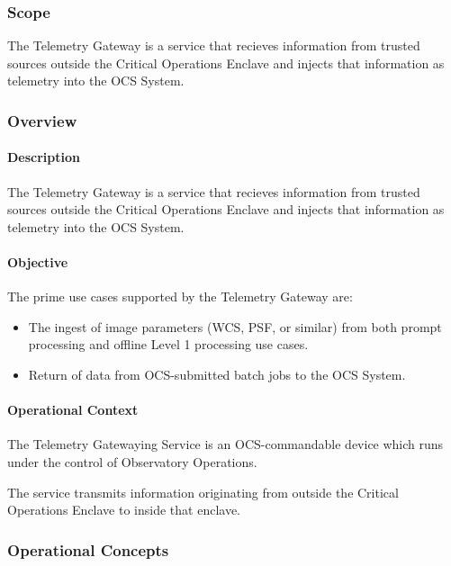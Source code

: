 \subsubsection{Scope}

The Telemetry Gateway is a service that recieves information from
trusted sources outside the Critical Operations Enclave and injects
that information as telemetry into the OCS System.

\subsubsection{Overview}

\paragraph{Description}

The Telemetry Gateway is a service that recieves information from
trusted sources outside the Critical Operations Enclave and injects
that information as telemetry into the OCS System.

\paragraph{Objective}

The prime use cases supported by the Telemetry Gateway are:

\begin{itemize}
\item The ingest of image parameters (WCS, PSF, or similar) from both prompt
processing and offline Level 1 processing use cases.
\item Return of data from OCS-submitted batch jobs to the OCS System.
\end{itemize}

\paragraph{Operational Context}

The Telemetry Gatewaying Service is an OCS-commandable device which runs
under the control of Observatory Operations.

The service transmits information originating from outside the Critical Operations
Enclave to inside that enclave.

\subsubsection{Operational Concepts}

